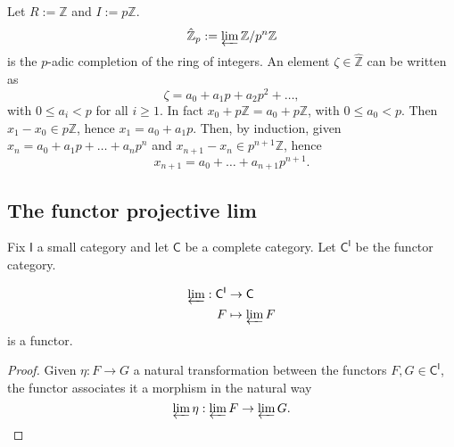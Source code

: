 \begin{ex}
	Let $R := \mathbb{Z}$ and $I := p  \mathbb{Z}$.
	\begin{equation}
		\hat{\mathbb{Z}}_p := \varprojlim \mathbb{Z}/p^n \mathbb{Z}
	\end{equation} 
	is the $p$-adic completion of the ring of integers.
	An element $\zeta \in \hat{\mathbb{Z}}$ can be written as
	\begin{equation}
	\zeta = a_0 + a_1 p + a_2 p^2 + \ldots
	,\end{equation} 
	with $0 \leq a_i < p$ for all  $i \geq 1$.
	In fact $x_0 + p \mathbb{Z} = a_0 + p\mathbb{Z}$, with $0 \leq a_0 < p$.
	Then $x_1 - x_0 \in p \mathbb{Z}$, hence $x_1 = a_0 + a_1 p$.
	Then, by induction, given  $x_n = a_0 + a_1 p + \ldots + a_{n} p^{n}$ and $x_{n+1} - x_n \in p^{n+1} \mathbb{Z}$, hence
	\begin{equation}
	x_{n+1} = a_0 + \ldots + a_{n+1} p^{n+1}
	.\end{equation} 
\end{ex} 

\subsection{The functor projective lim}
Fix $\mathsf{I}$ a small category and let $\mathsf{C}$ be a complete category.
Let $\mathsf{C}^{\mathsf{I}}$ be the functor category.

\begin{prop}
	\begin{align}
		\varprojlim: \mathsf{C}^{\mathsf{I}} &\to \mathsf{C} \\
		F &\mapsto \varprojlim F
	\end{align} 
	is a functor.
\end{prop} 	
\begin{proof}
	Given $\eta: F \to G$ a natural transformation between the functors
	$F, G \in \mathsf{C}^{\mathsf{I}}$, the functor associates it a morphism in the natural way
	\begin{equation}
	\varprojlim \eta: \varprojlim F \to \varprojlim G
	.\end{equation} 
\end{proof}

